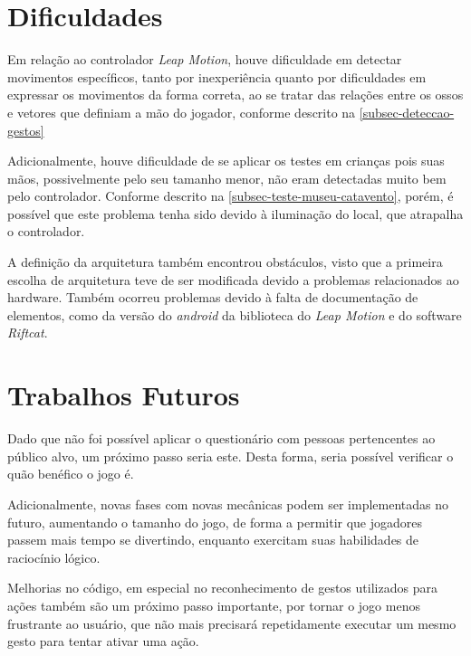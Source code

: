 \section{Dificuldades}\label{sec-conc-dificuldades}

Em relação ao controlador \textit{Leap Motion}, houve dificuldade em detectar
movimentos específicos, tanto por inexperiência quanto por dificuldades 
em expressar os movimentos da forma correta, ao se tratar das relações entre 
os ossos e vetores que definiam a mão do jogador, conforme descrito na
\autoref{subsec-deteccao-gestos}

Adicionalmente, houve dificuldade de se aplicar os testes em crianças pois
suas mãos, possivelmente pelo seu tamanho menor, não eram detectadas muito 
bem pelo controlador. Conforme descrito na 
\autoref{subsec-teste-museu-catavento}, porém, é possível que este problema 
tenha sido devido à iluminação do local, que atrapalha o controlador.

A definição da arquitetura também encontrou obstáculos, visto que a 
primeira escolha de arquitetura teve de ser modificada devido 
a problemas relacionados ao hardware. Também ocorreu problemas devido à falta de documentação de elementos, como da versão do \textit{android} da biblioteca do \textit{Leap Motion} e do software \textit{Riftcat}.



\section{Trabalhos Futuros}\label{sec-conc-trabalhos-futuros}

Dado que não foi possível aplicar o questionário com pessoas pertencentes ao 
público alvo, um próximo passo seria este. Desta forma, seria possível verificar 
o quão benéfico o jogo é.

Adicionalmente, novas fases com novas mecânicas podem ser implementadas no 
futuro, aumentando o tamanho do jogo, de forma a permitir que jogadores 
passem mais tempo se divertindo, enquanto exercitam suas habilidades de 
raciocínio lógico.

Melhorias no código, em especial no reconhecimento de gestos utilizados 
para ações também são um próximo passo importante, por tornar o jogo 
menos frustrante ao usuário, que não mais precisará repetidamente executar 
um mesmo gesto para tentar ativar uma ação.